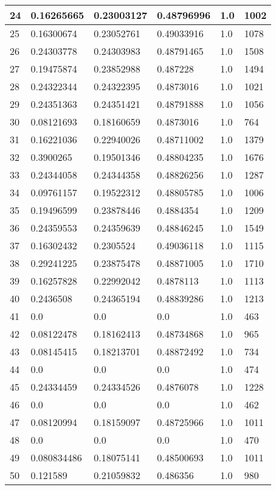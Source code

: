 \begin{longtable}{|l|l|l|l|l|l|}
24 & 0.16265665 & 0.23003127 & 0.48796996 & 1.0 & 1002 \\ \hline 
25 & 0.16300674 & 0.23052761 & 0.49033916 & 1.0 & 1078 \\ \hline 
26 & 0.24303778 & 0.24303983 & 0.48791465 & 1.0 & 1508 \\ \hline 
27 & 0.19475874 & 0.23852988 & 0.487228 & 1.0 & 1494 \\ \hline 
28 & 0.24322344 & 0.24322395 & 0.4873016 & 1.0 & 1021 \\ \hline 
29 & 0.24351363 & 0.24351421 & 0.48791888 & 1.0 & 1056 \\ \hline 
30 & 0.08121693 & 0.18160659 & 0.4873016 & 1.0 & 764 \\ \hline 
31 & 0.16221036 & 0.22940026 & 0.48711002 & 1.0 & 1379 \\ \hline 
32 & 0.3900265 & 0.19501346 & 0.48804235 & 1.0 & 1676 \\ \hline 
33 & 0.24344058 & 0.24344358 & 0.48826256 & 1.0 & 1287 \\ \hline 
34 & 0.09761157 & 0.19522312 & 0.48805785 & 1.0 & 1006 \\ \hline 
35 & 0.19496599 & 0.23878446 & 0.4884354 & 1.0 & 1209 \\ \hline 
36 & 0.24359553 & 0.24359639 & 0.48846245 & 1.0 & 1549 \\ \hline 
37 & 0.16302432 & 0.2305524 & 0.49036118 & 1.0 & 1115 \\ \hline 
38 & 0.29241225 & 0.23875478 & 0.48871005 & 1.0 & 1710 \\ \hline 
39 & 0.16257828 & 0.22992042 & 0.4878113 & 1.0 & 1113 \\ \hline 
40 & 0.2436508 & 0.24365194 & 0.48839286 & 1.0 & 1213 \\ \hline 
41 & 0.0 & 0.0 & 0.0 & 1.0 & 463 \\ \hline 
42 & 0.08122478 & 0.18162413 & 0.48734868 & 1.0 & 965 \\ \hline 
43 & 0.08145415 & 0.18213701 & 0.48872492 & 1.0 & 734 \\ \hline 
44 & 0.0 & 0.0 & 0.0 & 1.0 & 474 \\ \hline 
45 & 0.24334459 & 0.24334526 & 0.4876078 & 1.0 & 1228 \\ \hline 
46 & 0.0 & 0.0 & 0.0 & 1.0 & 462 \\ \hline 
47 & 0.08120994 & 0.18159097 & 0.48725966 & 1.0 & 1011 \\ \hline 
48 & 0.0 & 0.0 & 0.0 & 1.0 & 470 \\ \hline 
49 & 0.080834486 & 0.18075141 & 0.48500693 & 1.0 & 1011 \\ \hline 
50 & 0.121589 & 0.21059832 & 0.486356 & 1.0 & 980 \\ \hline 
\end{longtable}